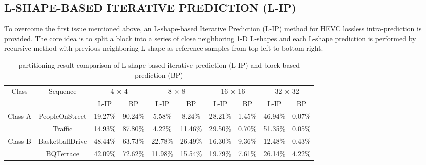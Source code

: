 \documentclass[journal]{IEEEtran}
\begin{document}
\subsection{L-SHAPE-BASED ITERATIVE PREDICTION (L-IP)}
To overcome the first issue mentioned above, an L-shape-based Iterative Prediction (L-IP) method for HEVC lossless intra-prediction is provided. The core idea is to split a block into a series of close neighboring 1-D L-shapes and each L-shape prediction is performed by recursive method with previous neighboring L-shape as reference samples from top left to bottom right.

\begin{table}[]
    \centering
    \caption{partitioning result comparison of L-shape-based iterative prediction (L-IP) and block-based prediction (BP)}
    \label{table: partitioning result}
    \begin{tabular}{c|c|cc|cc|cc|cc}
        \toprule
        \multirow{2}{*}{Class}                                  & \multirow{2}{*}{Sequence}     & \multicolumn{2}{c|}{4 × 4}   & \multicolumn{2}{c|}{8 × 8}   & \multicolumn{2}{c|}{16 × 16} & \multicolumn{2}{c}{32 × 32}                                       \\
                                                                &                               & L-IP                         & BP                           & L-IP                         & BP                          & L-IP    & BP     & L-IP    & BP     \\ \hline
        \multirow{2}{*}{Class A}                                & PeopleOnStreet                & 19.27\%                      & 90.24\%                      & 5.58\%                       & 8.24\%                      & 28.21\% & 1.45\% & 46.94\% & 0.07\% \\
                                                                & Traffic                       & 14.93\%                      & 87.80\%                      & 4.22\%                       & 11.46\%                     & 29.50\% & 0.70\% & 51.35\% & 0.05\% \\ \hline
        \multirow{2}{*}{Class B}                                & BasketballDrive               & 48.44\%                      & 63.73\%                      & 22.78\%                      & 26.49\%                     & 16.30\% & 9.36\% & 12.48\% & 0.43\% \\
                                                                & BQTerrace                     & 42.09\%                      & 72.62\%                      & 11.98\%                      & 15.54\%                     & 19.79\% & 7.61\% & 26.14\% & 4.22\% \\ \hline

\end{tabular}
\end{table}
\end{document}
